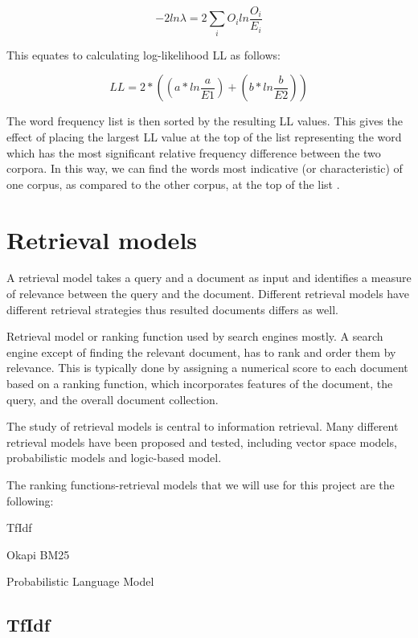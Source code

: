 \begin{equation}
-2ln\lambda=2\sum_{i}{O_{i}}{ln \frac{O_{i}}{E_{i}}}
\end{equation}

This equates to calculating log-likelihood LL as follows:

\begin{equation}
LL =2*((a*ln \frac{a}{E1}) + (b*ln \frac{b}{E2}))
\end{equation}

The word frequency list is then sorted by the resulting LL values. This gives the effect of placing the largest LL value at the top of the list representing the word which has the most significant relative frequency difference between the two corpora. In this way, we can find the words most indicative (or characteristic) of one corpus, as compared to the other corpus, at the top of the list \cite{RaysonGarside}.


\section{Retrieval models}

A retrieval model takes a query and a document as input and identifies a measure of relevance between the query and the document. Different retrieval models have different retrieval strategies thus resulted documents differs as well.

Retrieval model or ranking function used by search engines mostly. A search engine except of finding the relevant document, has to rank and order them by relevance. This is typically done by assigning a numerical score to each document based on a ranking function, which incorporates features of the document, the query, and the overall document collection.

The study of retrieval models is central to information retrieval. Many different retrieval models have been proposed and tested, including vector space models, probabilistic models and logic-based model.

The ranking functions-retrieval models that we will use for this project are the following:
\begin{list}{.}{}
\item TfIdf
\item Okapi BM25
\item Probabilistic Language Model
\end{list}

\subsection{TfIdf}

